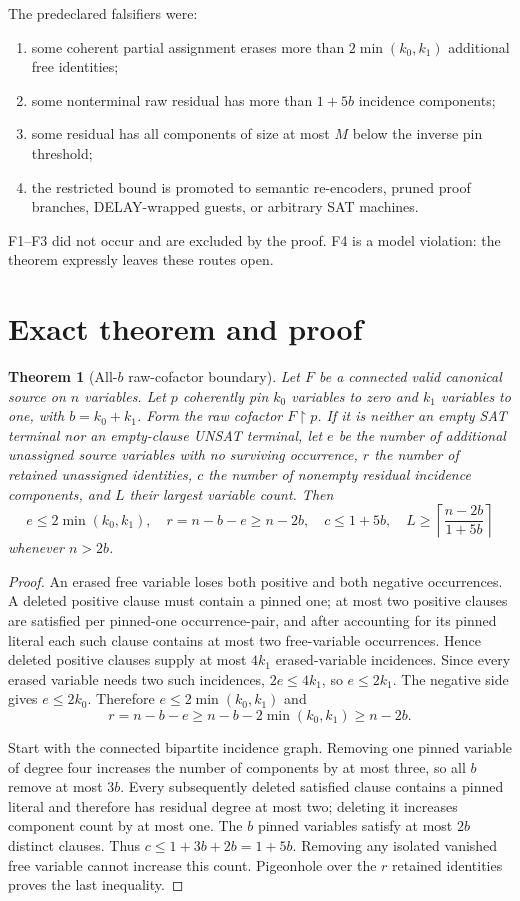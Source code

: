 \documentclass[11pt]{article}
\newtheorem{theorem}{Theorem}
\begin{document}
The predeclared falsifiers were:
\begin{enumerate}[label=F\arabic*.]
\item some coherent partial assignment erases more than $2\min(k_0,k_1)$ additional free identities;
\item some nonterminal raw residual has more than $1+5b$ incidence components;
\item some residual has all components of size at most $M$ below the inverse pin threshold;
\item the restricted bound is promoted to semantic re-encoders, pruned proof branches, DELAY-wrapped guests, or arbitrary SAT machines.
\end{enumerate}
F1--F3 did not occur and are excluded by the proof.  F4 is a model violation: the theorem expressly leaves these routes open.

\section{Exact theorem and proof}
\begin{theorem}[All-$b$ raw-cofactor boundary]
Let $F$ be a connected valid canonical source on $n$ variables.  Let $p$ coherently pin $k_0$ variables to zero and $k_1$ variables to one, with $b=k_0+k_1$.  Form the raw cofactor $F\restriction p$.  If it is neither an empty SAT terminal nor an empty-clause UNSAT terminal, let $e$ be the number of additional unassigned source variables with no surviving occurrence, $r$ the number of retained unassigned identities, $c$ the number of nonempty residual incidence components, and $L$ their largest variable count.  Then
\[
e\le2\min(k_0,k_1),\quad r=n-b-e\ge n-2b,
\quad c\le1+5b,
\quad L\ge\left\lceil\frac{n-2b}{1+5b}\right\rceil
\]
whenever $n>2b$.
\end{theorem}
\begin{proof}
An erased free variable loses both positive and both negative occurrences.  A deleted positive clause must contain a pinned one; at most two positive clauses are satisfied per pinned-one occurrence-pair, and after accounting for its pinned literal each such clause contains at most two free-variable occurrences.  Hence deleted positive clauses supply at most $4k_1$ erased-variable incidences.  Since every erased variable needs two such incidences, $2e\le4k_1$, so $e\le2k_1$.  The negative side gives $e\le2k_0$.  Therefore $e\le2\min(k_0,k_1)$ and
\[
r=n-b-e\ge n-b-2\min(k_0,k_1)\ge n-2b.
\]

Start with the connected bipartite incidence graph.  Removing one pinned variable of degree four increases the number of components by at most three, so all $b$ remove at most $3b$.  Every subsequently deleted satisfied clause contains a pinned literal and therefore has residual degree at most two; deleting it increases component count by at most one.  The $b$ pinned variables satisfy at most $2b$ distinct clauses.  Thus $c\le1+3b+2b=1+5b$.  Removing any isolated vanished free variable cannot increase this count.  Pigeonhole over the $r$ retained identities proves the last inequality.
\end{proof}
\end{document}
